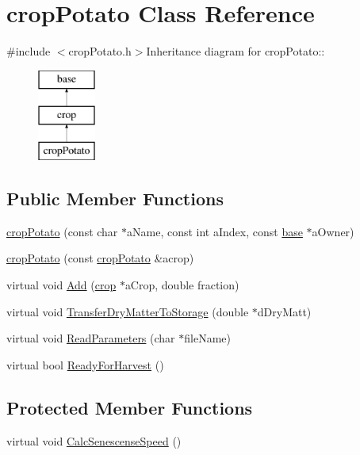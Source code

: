 \hypertarget{classcrop_potato}{
\section{cropPotato Class Reference}
\label{classcrop_potato}
}


{\ttfamily \#include $<$cropPotato.h$>$}Inheritance diagram for cropPotato::\begin{figure}[H]
\begin{center}
\leavevmode
\includegraphics[height=3cm]{classcrop_potato}
\end{center}
\end{figure}
\subsection*{Public Member Functions}
\begin{DoxyCompactItemize}
\item 
\hyperlink{classcrop_potato_a7bca57ea9a8637251d82034d91a2ead0}{cropPotato} (const char $\ast$aName, const int aIndex, const \hyperlink{classbase}{base} $\ast$aOwner)
\item 
\hyperlink{classcrop_potato_a721e52113fa0b383487d8490f64cb127}{cropPotato} (const \hyperlink{classcrop_potato}{cropPotato} \&acrop)
\item 
virtual void \hyperlink{classcrop_potato_a30a6b30efbf7c829443065659af4c6e3}{Add} (\hyperlink{classcrop}{crop} $\ast$aCrop, double fraction)
\item 
virtual void \hyperlink{classcrop_potato_a6fcc63dfefbe4d6c6753c6ba0d71ea8f}{TransferDryMatterToStorage} (double $\ast$dDryMatt)
\item 
virtual void \hyperlink{classcrop_potato_a627a0b8cc554dfe44a2ec6576828267a}{ReadParameters} (char $\ast$fileName)
\item 
virtual bool \hyperlink{classcrop_potato_ac3aabdce7024004252aec7b0c150ddf3}{ReadyForHarvest} ()
\end{DoxyCompactItemize}
\subsection*{Protected Member Functions}
\begin{DoxyCompactItemize}
\item 
virtual void \hyperlink{classcrop_potato_a5614feb2626d863c49f724b3b74dbd68}{CalcSenescenseSpeed} ()
\end{DoxyCompactItemize}
